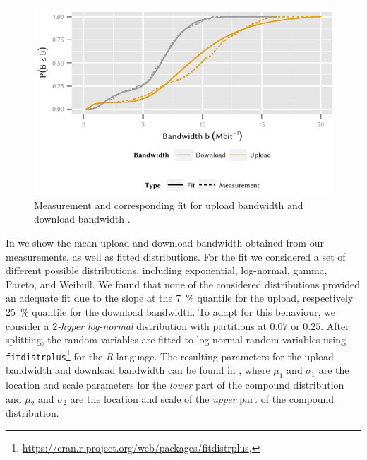 \begin{figure}
  \includegraphics{application/cloud_file_synchronization/application_measurements/figures/bandwidths}
  \caption{Measurement and corresponding fit for upload bandwidth \uploadbandwidth and download bandwidth \downloadbandwidth.}
  \label{fig:application:cloud_file_synchronisation:application_measurements:bandwidth_preparation_times:measurement_setup:bandwidths}
\end{figure}

In  we show the mean upload and download bandwidth obtained from our measurements, as well as fitted distributions.
For the fit we considered a set of different possible distributions, including exponential, log-normal, gamma, Pareto, and Weibull.
We found that none of the considered distributions provided an adequate fit due to the slope at the \SI{7}{\percent} quantile for the upload, respectively \SI{25}{\percent} quantile for the download bandwidth.
To adapt for this behaviour, we consider a \emph{$2$-hyper log-normal} distribution \cite{Wang2006} with partitions at \(0.07\) or \({0.25}\).
After splitting, the random variables are fitted to log-normal random variables using \texttt{fitdistrplus}\footnote{\url{https://cran.r-project.org/web/packages/fitdistrplus}, \accessed} for the \emph{R} language.
The resulting parameters for the upload bandwidth \uploadbandwidth and download bandwidth \downloadbandwidth can be found in , where \(\mu_1\) and \(\sigma_1\) are the location and scale parameters for the \emph{lower} part of the compound distribution and \(\mu_2\) and \(\sigma_2\) are the location and scale of the \emph{upper} part of the compound distribution.


